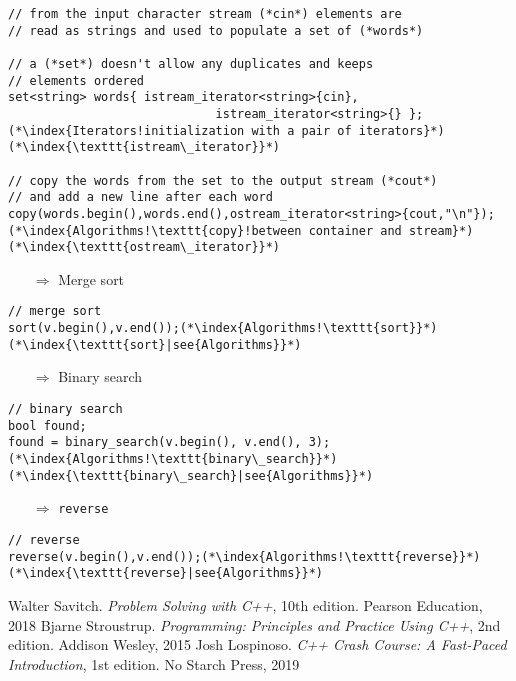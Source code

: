 \documentclass[10pt]{article}
\begin{document}
\begin{lstlisting}
// from the input character stream (*cin*) elements are 
// read as strings and used to populate a set of (*words*)

// a (*set*) doesn't allow any duplicates and keeps
// elements ordered
set<string> words{ istream_iterator<string>{cin},
                             istream_iterator<string>{} };(*\index{Iterators!initialization with a pair of iterators}*)(*\index{\texttt{istream\_iterator}}*)
                             
// copy the words from the set to the output stream (*cout*)
// and add a new line after each word
copy(words.begin(),words.end(),ostream_iterator<string>{cout,"\n"});(*\index{Algorithms!\texttt{copy}!between container and stream}*)(*\index{\texttt{ostream\_iterator}}*)
\end{lstlisting}
\begin{enumerate}
\item[$\Rightarrow$] Merge sort
\end{enumerate}
\begin{lstlisting}
// merge sort
sort(v.begin(),v.end());(*\index{Algorithms!\texttt{sort}}*)(*\index{\texttt{sort}|see{Algorithms}}*)
\end{lstlisting}
\begin{enumerate}
\item[$\Rightarrow$] Binary search
\end{enumerate}
\begin{lstlisting}
// binary search
bool found;
found = binary_search(v.begin(), v.end(), 3);(*\index{Algorithms!\texttt{binary\_search}}*)(*\index{\texttt{binary\_search}|see{Algorithms}}*)
\end{lstlisting}
\begin{enumerate}
\item[$\Rightarrow$] \texttt{reverse}
\end{enumerate}
\begin{lstlisting}
// reverse
reverse(v.begin(),v.end());(*\index{Algorithms!\texttt{reverse}}*)(*\index{\texttt{reverse}|see{Algorithms}}*)
\end{lstlisting}
%
%
\small
\begin{thebibliography}{99}
 Walter Savitch. \textsl{Problem Solving with C++}, 10th edition. Pearson Education, 2018
 Bjarne Stroustrup. \textsl{Programming: Principles and Practice Using C++}, 2nd edition. Addison Wesley, 2015
 Josh Lospinoso. \textsl{C++ Crash Course: A Fast-Paced Introduction}, 1st edition. No Starch Press, 2019
\end{thebibliography}
%
%
\printindex
\end{document}
